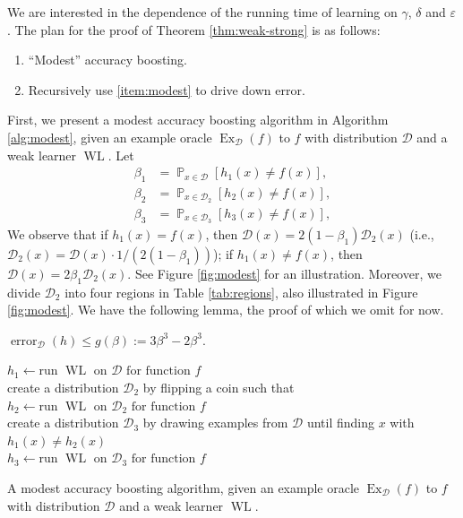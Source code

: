 \documentclass[letterpaper, reqno,11pt]{article}
\newcommand{\PP}{\mathop{{}\mathbb{P}}}
\DeclareMathOperator{\Ex}{Ex}
\DeclareMathOperator{\error}{error}
\DeclareMathOperator{\Maj}{Maj}
\DeclareMathOperator{\WL}{WL}
\begin{document}
We are interested in the dependence of the running time of learning on $\gamma$, $\delta$ and $\varepsilon$. The plan for the proof of Theorem \ref{thm:weak-strong} is as follows:
\begin{enumerate}[label=(\roman*), itemsep=0pt]
  \item \label{item:modest} ``Modest'' accuracy boosting.
  \item Recursively use \ref{item:modest} to drive down error.
\end{enumerate}

First, we present a modest accuracy boosting algorithm in Algorithm \ref{alg:modest}, given an example oracle $\Ex_{\mathcal D}(f)$ to $f$ with distribution $\mathcal D$ and a weak learner $\WL$. Let
\begin{align*}
  \beta_1 &= \PP_{x \in \mathcal D}\left[h_1(x) \neq f(x)\right], \\
  \beta_2 &= \PP_{x \in \mathcal D_2}\left[h_2(x) \neq f(x)\right], \\
  \beta_3 &= \PP_{x \in \mathcal D_3}\left[h_3(x) \neq f(x)\right],
\end{align*}
We observe that if $h_1(x) = f(x)$, then $\mathcal D(x) = 2(1 - \beta_1) \mathcal D_2(x)$ (i.e., $\mathcal D_2(x) = \mathcal D(x) \cdot 1/(2(1 - \beta_1))$); if $h_1(x) \neq f(x)$, then $\mathcal D(x) = 2\beta_1 \mathcal D_2(x)$. See Figure \ref{fig:modest} for an illustration. Moreover, we divide $\mathcal D_2$ into four regions in Table \ref{tab:regions}, also illustrated in Figure \ref{fig:modest}. We have the following lemma, the proof of which we omit for now.

\begin{lemma}
  $\error_{\mathcal D}(h) \leq g(\beta) := 3\beta^3 - 2\beta^3$.
\end{lemma}

\begin{algorithm}[h]
  $h_1 \leftarrow \text{run $\WL$ on $\mathcal D$ for function $f$}$ \\
  create a distribution $\mathcal D_2$ by flipping a coin such that \\
  {\Indp{}
  }
  $h_2 \leftarrow \text{run $\WL$ on $\mathcal D_2$ for function $f$}$ \CommentSty{($\error_{\mathcal D_2}(h_1) = 1/2$)} \\
  create a distribution $\mathcal D_3$ by drawing examples from $\mathcal D$ until finding $x$ with $h_1(x) \neq h_2(x)$ \\
  $h_3 \leftarrow \text{run $\WL$ on $\mathcal D_3$ for function $f$}$
  \caption{A modest accuracy boosting algorithm, given an example oracle $\Ex_{\mathcal D}(f)$ to $f$ with distribution $\mathcal D$ and a weak learner $\WL$.}
  \Return{$\Maj(h_1, h_2, h_3)$} 
  \label{alg:modest}
\end{algorithm}
\end{document}
